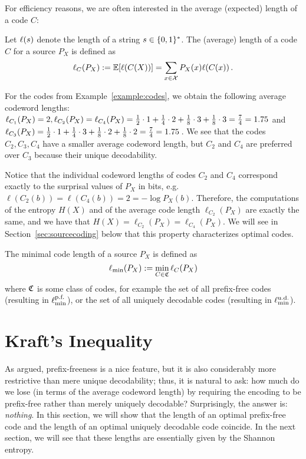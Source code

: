For efficiency reasons, we are often interested in the average (expected) length of a code $C$:
\begin{definition}
Let $\ell(s)$ denote the length of a string $s \in \{0,1\}^*$. The (average) length of a code $C$ for a source $P_X$ is defined as
\[
\ell_C(P_X) := \mathbb{E}[\ell(C(X))] = \sum_{x \in \cal X} P_X(x) \ell(C(x)) \, .
\]
\end{definition}
\begin{example} For the codes from Example~\ref{example:codes}, we
  obtain the following average codeword lengths: $\ell_{C_1}(P_X) = 2,
  \ell_{C_2}(P_X)=\ell_{C_4}(P_X)=\frac{1}{2} \cdot 1 + \frac{1}{4} \cdot 2 +
  \frac{1}{8} \cdot 3 + \frac{1}{8} \cdot 3 = \frac{7}{4} = 1.75$ and
  $\ell_{C_3}(P_X) =  \frac{1}{2} \cdot 1 + \frac{1}{4} \cdot 3 +
  \frac{1}{8} \cdot 2 + \frac{1}{8} \cdot 2 = \frac{7}{4} = 1.75 \,$. We see that the codes $C_2,C_3,C_4$ have a smaller average codeword length, but $C_2$ and $C_4$ are preferred over $C_3$ because their unique decodability. 

Notice that the individual codeword lengths of codes $C_2$ and $C_4$ correspond exactly to the surprisal values of $P_X$ in bits, e.g.\ $\ell(C_2(b)) = \ell(C_4(b))  = 2 = -\log P_X(b)$. Therefore, the computations of the entropy $H(X)$ and of the average code length $\ell_{C_2}(P_X)$ are exactly the same, and we have that $H(X) = \ell_{C_2}(P_X) = \ell_{C_4}(P_X)$. We will see in Section~\ref{sec:sourcecoding} below that this property characterizes optimal codes.
\end{example}

\begin{definition}
The minimal code length of a source $P_X$ is defined as
\[
\ell_{\min}(P_X) := \min_{C \in \frak{C}} \ell_C(P_X)
\]
where $\frak{C}$ is some class of codes, for example the set of all prefix-free codes (resulting in $\ell_{\min}^{\text{\rm p.f.}}$), or the set of all uniquely decodable codes (resulting in $\ell_{\min}^{\text{\rm u.d.}}$). 
\end{definition}



\section{Kraft's Inequality}\label{sec:kraft}
As argued, prefix-freeness is a nice feature, but it is also considerably more restrictive than mere unique decodability; thus, it is natural to ask: how much do we lose (in terms of the average codeword length) by requiring the encoding to be prefix-free rather than merely uniquely decodable? Surprisingly, the answer is: {\em nothing}. In this section, we will show that the length of an optimal prefix-free code and the length of an optimal uniquely decodable code coincide. In the next section, we will see that these lengths are essentially given by the Shannon entropy.

